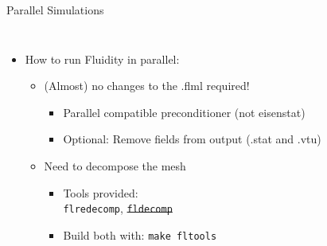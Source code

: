 \documentclass[t, hyperref={pdfpagelabels=false}]{beamer}
\begin{document}
\begin{frame}{Parallel Simulations}
  \begin{columns}[t]

    \begin{itemize}
    \item[] How to run Fluidity in parallel:
      \begin{itemize}
        \vspace{1em}
      \item (Almost) no changes to the .flml required!
        \begin{itemize}
        \item Parallel compatible preconditioner (not eisenstat)
        \item Optional: Remove fields from output (.stat and .vtu)
        \end{itemize}

        \vspace{1em}
      \item Need to decompose the mesh
        \begin{itemize}
        \item Tools provided:
          \\\lstinline+flredecomp+, \sout{\lstinline+fldecomp+}
          \vspace{2pt}
        \item Build both with: \lstinline+make fltools+
        \end{itemize}
      \end{itemize}
    \end{itemize}

    \vspace{2em}
    \begin{figure}[ht] \centering
      \begin{tikzpicture}[scale=0.8]
        
      \end{tikzpicture}
    \end{figure}
  \end{columns}
\end{frame}
\end{document}
